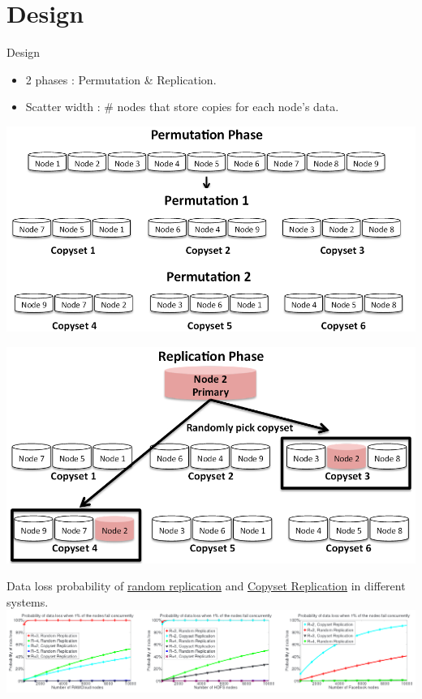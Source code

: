\documentclass[xcolor=table]{beamer}
\begin{document}
	\section{Design}
	\begin{frame}{Design}
		\begin{itemize}
			\small
			\item 2 phases : \alert{Permutation} \& \alert{Replication}.
			\item Scatter width : \# nodes that store copies for each node’s data.
		\end{itemize}
		\begin{minipage}[b]{0.49\linewidth}
			\centering
			\includegraphics[width=1\textwidth]{5.png}
		\end{minipage}
		\begin{minipage}[b]{0.49\linewidth}
			\centering
			\includegraphics[width=1\textwidth]{6.png}
		\end{minipage}
	\end{frame}

	\begin{frame}
		\small
		\alert{Data loss probability} of \underline{random replication} and \underline{Copyset Replication} in different systems.
		\includegraphics[width=1\textwidth]{7.png}
	\end{frame}
\end{document}
